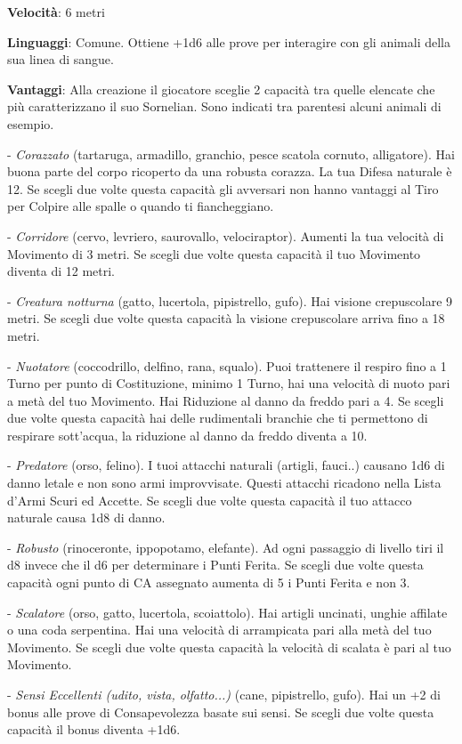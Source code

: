 \begin{multicols}{2}
\textbf{Velocità}: 6 metri

\textbf{Linguaggi}: Comune. Ottiene +1d6 alle prove per interagire con gli animali della sua linea di sangue.

\textbf{Vantaggi}: Alla creazione il giocatore sceglie 2 capacità tra quelle elencate che più caratterizzano il suo Sornelian. Sono indicati tra parentesi alcuni animali di esempio.

- \emph{Corazzato} (tartaruga, armadillo, granchio, pesce scatola cornuto, alligatore). Hai buona parte del corpo ricoperto da una robusta corazza. La tua Difesa naturale è 12. Se scegli due volte questa capacità gli avversari non hanno vantaggi al Tiro per Colpire alle spalle o quando ti fiancheggiano.

- \emph{Corridore} (cervo, levriero, saurovallo, velociraptor). Aumenti la tua velocità di Movimento di 3 metri. Se scegli due volte questa capacità il tuo Movimento diventa di 12 metri.

- \emph{Creatura notturna} (gatto, lucertola, pipistrello, gufo). Hai visione crepuscolare 9 metri. Se scegli due volte questa capacità la visione crepuscolare arriva fino a 18 metri.

- \emph{Nuotatore} (coccodrillo, delfino, rana, squalo). Puoi trattenere il respiro fino a 1 Turno per punto di Costituzione, minimo 1 Turno, hai una velocità di nuoto pari a metà del tuo Movimento. Hai Riduzione al danno da freddo pari a 4. Se scegli due volte questa capacità hai delle rudimentali branchie che ti permettono di respirare sott'acqua, la riduzione al danno da freddo diventa a 10.

- \emph{Predatore} (orso, felino). I tuoi attacchi naturali (artigli, fauci..) causano 1d6 di danno letale e non sono armi improvvisate. Questi attacchi ricadono nella Lista d'Armi Scuri ed Accette. Se scegli due volte questa capacità il tuo attacco naturale causa 1d8 di danno.

- \emph{Robusto} (rinoceronte, ippopotamo, elefante). Ad ogni passaggio di livello tiri il d8 invece che il d6 per determinare i Punti Ferita. Se scegli due volte questa capacità ogni punto di CA assegnato aumenta di 5 i Punti Ferita e non 3.

- \emph{Scalatore} (orso, gatto, lucertola, scoiattolo). Hai artigli uncinati, unghie affilate o una coda serpentina. Hai una velocità di arrampicata pari alla metà del tuo Movimento. Se scegli due volte questa capacità la velocità di scalata è pari al tuo Movimento.

- \emph{Sensi Eccellenti (udito, vista, olfatto...)} (cane, pipistrello, gufo). Hai un +2 di bonus alle prove di Consapevolezza basate sui sensi. Se scegli due volte questa capacità il bonus diventa +1d6.


\end{multicols}
